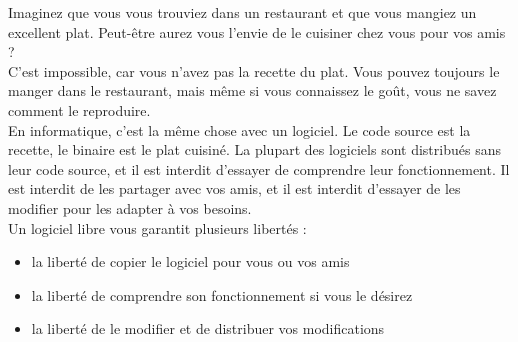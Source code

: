 \documentclass{article}
\begin{document}
Imaginez que vous vous trouviez dans un restaurant et que vous mangiez un excellent plat. Peut-être aurez vous l'envie de le cuisiner chez vous pour vos amis ? \vspace{5mm} \\
C'est impossible, car vous n'avez pas la recette du plat. Vous pouvez toujours le manger dans le restaurant, mais même si vous connaissez le goût, vous ne savez comment le reproduire. \vspace{5mm} \\
En informatique, c'est la même chose avec un logiciel. Le code source est la recette, le binaire est le plat cuisiné. La plupart des logiciels sont distribués sans leur code source, et il est interdit d'essayer de comprendre leur fonctionnement. Il est interdit de les partager avec vos amis, et il est interdit d'essayer de les modifier pour les adapter à vos besoins. \vspace{5mm} \\
Un logiciel libre vous garantit plusieurs libertés :

\begin{itemize}
    \item \vspace{0.5cm} la liberté de copier le logiciel pour vous ou vos amis
    \item \vspace{0.5cm} la liberté de comprendre son fonctionnement si vous le désirez
    \item \vspace{0.5cm} la liberté de le modifier et de distribuer vos modifications
\end{itemize}

\newpage
\end{document}
